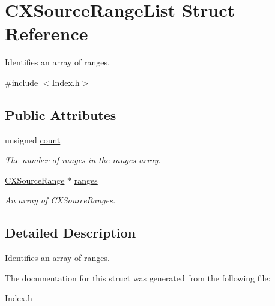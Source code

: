 \hypertarget{structCXSourceRangeList}{}\section{C\+X\+Source\+Range\+List Struct Reference}
\label{structCXSourceRangeList}


Identifies an array of ranges.  




{\ttfamily \#include $<$Index.\+h$>$}

\subsection*{Public Attributes}
\begin{DoxyCompactItemize}
\item 
\mbox{\label{structCXSourceRangeList_a8d96078ca094e4e98707001487feb78a}} 
unsigned \mbox{\hyperlink{structCXSourceRangeList_a8d96078ca094e4e98707001487feb78a}{count}}
\begin{DoxyCompactList}\small\item\em The number of ranges in the {\ttfamily ranges} array. \end{DoxyCompactList}\item 
\mbox{\label{structCXSourceRangeList_a5249f89df8acfcbbae6db8c6209743d5}} 
\mbox{\hyperlink{structCXSourceRange}{C\+X\+Source\+Range}} $\ast$ \mbox{\hyperlink{structCXSourceRangeList_a5249f89df8acfcbbae6db8c6209743d5}{ranges}}
\begin{DoxyCompactList}\small\item\em An array of {\ttfamily C\+X\+Source\+Ranges}. \end{DoxyCompactList}\end{DoxyCompactItemize}


\subsection{Detailed Description}
Identifies an array of ranges. 

The documentation for this struct was generated from the following file\+:\begin{DoxyCompactItemize}
\item 
Index.\+h\end{DoxyCompactItemize}
